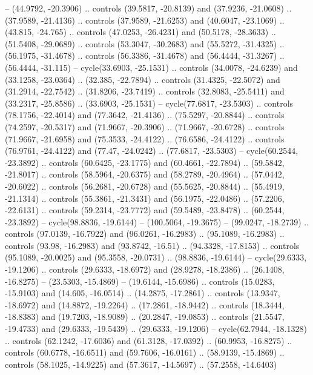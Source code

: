 {    -- (44.9792, -20.3906)
    .. controls (39.5817, -20.8139) and (37.9236, -21.0608) .. (37.9589, -21.4136)
    .. controls (37.9589, -21.6253) and (40.6047, -23.1069) .. (43.815, -24.765)
    .. controls (47.0253, -26.4231) and (50.5178, -28.3633) .. (51.5408, -29.0689)
    .. controls (53.3047, -30.2683) and (55.5272, -31.4325) .. (56.1975, -31.4678)
    .. controls (56.3386, -31.4678) and (56.4444, -31.3267) .. (56.4444, -31.115)
    -- cycle(33.6903, -25.1531)
    .. controls (34.0078, -24.6239) and (33.1258, -23.0364) .. (32.385, -22.7894)
    .. controls (31.4325, -22.5072) and (31.2914, -22.7542) .. (31.8206, -23.7419)
    .. controls (32.8083, -25.5411) and (33.2317, -25.8586) .. (33.6903, -25.1531)
    -- cycle(77.6817, -23.5303)
    .. controls (78.1756, -22.4014) and (77.3642, -21.4136) .. (75.5297, -20.8844)
    .. controls (74.2597, -20.5317) and (71.9667, -20.3906) .. (71.9667, -20.6728)
    .. controls (71.9667, -21.6958) and (75.3533, -24.4122) .. (76.6586, -24.4122)
    .. controls (76.9761, -24.4122) and (77.47, -24.0242) .. (77.6817, -23.5303)
    -- cycle(60.2544, -23.3892)
    .. controls (60.6425, -23.1775) and (60.4661, -22.7894) .. (59.5842, -21.8017)
    .. controls (58.5964, -20.6375) and (58.2789, -20.4964) .. (57.0442, -20.6022)
    .. controls (56.2681, -20.6728) and (55.5625, -20.8844) .. (55.4919, -21.1314)
    .. controls (55.3861, -21.3431) and (56.1975, -22.0486) .. (57.2206, -22.6131)
    .. controls (59.2314, -23.7772) and (59.5489, -23.8478) .. (60.2544, -23.3892)
    -- cycle(98.8836, -19.6144)
    -- (100.5064, -19.3675)
    -- (99.0247, -18.2739)
    .. controls (97.0139, -16.7922) and (96.0261, -16.2983) .. (95.1089, -16.2983)
    .. controls (93.98, -16.2983) and (93.8742, -16.51) .. (94.3328, -17.8153)
    .. controls (95.1089, -20.0025) and (95.3558, -20.0731) .. (98.8836, -19.6144)
    -- cycle(29.6333, -19.1206)
    .. controls (29.6333, -18.6972) and (28.9278, -18.2386) .. (26.1408, -16.8275)
    -- (23.5303, -15.4869)
    -- (19.6144, -15.6986)
    .. controls (15.0283, -15.9103) and (14.605, -16.0514) .. (14.2875, -17.2861)
    .. controls (13.9347, -18.6972) and (14.8872, -19.2264) .. (17.2861, -18.9442)
    .. controls (18.3444, -18.8383) and (19.7203, -18.9089) .. (20.2847, -19.0853)
    .. controls (21.5547, -19.4733) and (29.6333, -19.5439) .. (29.6333, -19.1206)
    -- cycle(62.7944, -18.1328)
    .. controls (62.1242, -17.6036) and (61.3128, -17.0392) .. (60.9953, -16.8275)
    .. controls (60.6778, -16.6511) and (59.7606, -16.0161) .. (58.9139, -15.4869)
    .. controls (58.1025, -14.9225) and (57.3617, -14.5697) .. (57.2558, -14.6403)
}

